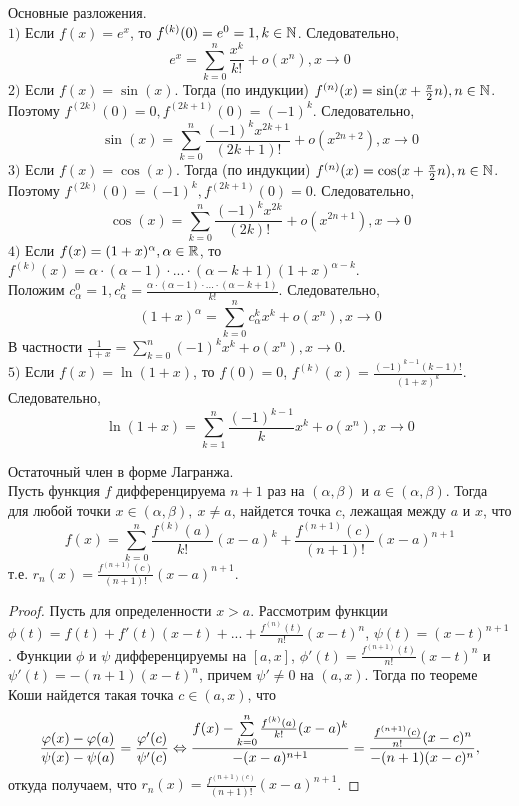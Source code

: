     \begin{theorem}{Основные разложения.}\\
        $1)$ Если $f(x) = e^{x}$, то $f^{(k)}(0) = e^{0} = 1, k \in \mathbb{N}$. Следовательно, 
        \[e^{x} = \sum_{k=0}^{n}\frac{x^{k}}{k!} + o(x^{n}), x \to 0\]
        $2)$ Если $f(x) = \sin(x)$. Тогда (по индукции) $f^{(n)}(x) = \sin(x + \frac{\pi}{2}n), n \in \mathbb{N}$. Поэтому $f^{(2k)}(0) = 0, f^{(2k+1)}(0) = (-1)^{k}$. Следовательно, 
        \[\sin(x) = \sum_{k = 0}^{n} \frac{(-1)^{k} x^{2k+1}}{(2k+1)!} + o(x^{2n+2}), x \to 0\]
        $3)$ Если $f(x) = \cos(x)$. Тогда (по индукции) $f^{(n)}(x) = \cos(x + \frac{\pi}{2}n), n \in \mathbb{N}$. Поэтому $f^{(2k)}(0) = (-1)^{k}, f^{(2k + 1)}(0) = 0$. Следовательно, 
        \[\cos(x) = \sum_{k = 0}^{n} \frac{(-1)^{k} x^{2k}}{(2k)!} + o(x^{2n+1}), x \to 0\]
        $4)$ Если $f(x) = (1+x)^{\alpha}, \alpha \in \mathbb{R}$, то $f^{(k)}(x) = \alpha \cdot (\alpha - 1) \cdot ... \cdot (\alpha - k + 1)(1+x)^{\alpha - k}$. \\
        Положим $c_{\alpha}^{0} = 1, c_{\alpha}^{k} = \frac{\alpha \cdot (\alpha - 1) \cdot ... \cdot (\alpha - k + 1)}{k!}$. Следовательно, 
        \[(1+x)^{\alpha} = \sum_{k = 0}^{n} c_{\alpha}^{k}x^{k} + o(x^{n}), x \to 0\]
        В частности $\frac{1}{1+x} = \sum_{k = 0}^{n} (-1)^{k} x^{k} + o(x^{n}), x \to 0$. \\
        $5)$ Если $f(x) = \ln(1+x)$, то $f(0) = 0$, $f^{(k)}(x) = \frac{(-1)^{k-1}(k-1)!}{(1+x)^{k}}$. Следовательно,
        \[\ln(1+x) = \sum_{k = 1}^{n} \frac{(-1)^{k-1}}{k}x^{k} + o(x^{n}), x \to 0\]
    \end{theorem}
    
    \begin{theorem}{Остаточный член в форме Лагранжа.}\\
        Пусть функция $f$ дифференцируема $n+1$ раз на $(\alpha , \beta)$ и $a \in (\alpha, \beta)$. Тогда для любой точки $x \in (\alpha, \beta),\ x \neq a$, найдется точка $c$, лежащая между $a$ и $x$, что
        \[f(x) = \sum_{k = 0}^{n}\frac{f^{(k)}(a)}{k!}(x-a)^{k} + \frac{f^{(n+1)}(c)}{(n+1)!}(x-a)^{n+1}\]
        т.е. $r_{n}(x) = \frac{f^{(n+1)}(c)}{(n+1)!}(x-a)^{n+1}$.
    \end{theorem}
    
    \begin{proof}
        Пусть для определенности $x > a$. Рассмотрим функции $\phi (t) = f(t) + f'(t)(x-t) + ... + \frac{f^{(n)}(t)}{n!}(x-t)^{n}$, $\psi (t) = (x-t)^{n+1}$. Функции $\phi$ и $\psi$ дифференцируемы на $[a,x]$, $\phi'(t) = \frac{f^{(n+1)}(t)}{n!}(x - t)^{n}$ и $\psi'(t) = -(n+1)(x-t)^{n}$, причем $\psi' \neq 0$ на $(a, x)$. Тогда по теореме Коши найдется такая точка $c \in (a,x)$, что
        \[\frac{\varphi(x) - \varphi(a)}{\psi(x) - \psi(a)} = \frac{\varphi'(c)}{\psi'(c)} \Leftrightarrow \frac{f(x) - \sum\limits_{k=0}^{n}\frac{f^{(k)}(a)}{k!}(x-a)^{k}}{-(x-a)^{n+1}} = \frac{\frac{f^{(n+1)}(c)}{n!}(x - c)^{n}}{-(n+1)(x-c)^{n}},\]
        откуда получаем, что $r_{n}(x) = \frac{f^{(n+1)(c)}}{(n+1)!}(x-a)^{n+1}$.
    \end{proof}
    
